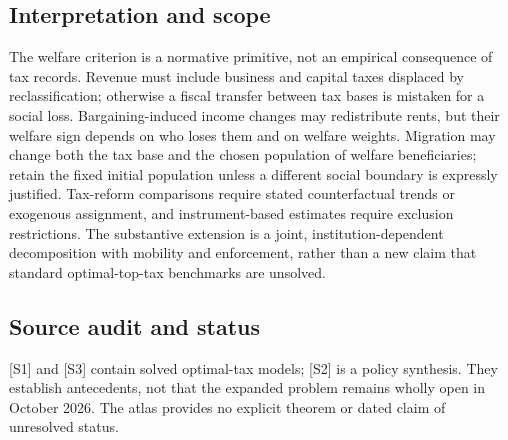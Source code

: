 \documentclass[11pt,a4paper]{article}
\begin{document}
\subsection*{Interpretation and scope}
The welfare criterion is a normative primitive, not an empirical consequence of tax records. Revenue must include business and capital taxes displaced by reclassification; otherwise a fiscal transfer between tax bases is mistaken for a social loss. Bargaining-induced income changes may redistribute rents, but their welfare sign depends on who loses them and on welfare weights. Migration may change both the tax base and the chosen population of welfare beneficiaries; retain the fixed initial population unless a different social boundary is expressly justified. Tax-reform comparisons require stated counterfactual trends or exogenous assignment, and instrument-based estimates require exclusion restrictions. The substantive extension is a joint, institution-dependent decomposition with mobility and enforcement, rather than a new claim that standard optimal-top-tax benchmarks are unsolved.

\subsection*{Source audit and status}
[S1] and [S3] contain solved optimal-tax models; [S2] is a policy synthesis. They establish antecedents, not that the expanded problem remains wholly open in October 2026. The atlas provides no explicit theorem or dated claim of unresolved status.
\end{document}
